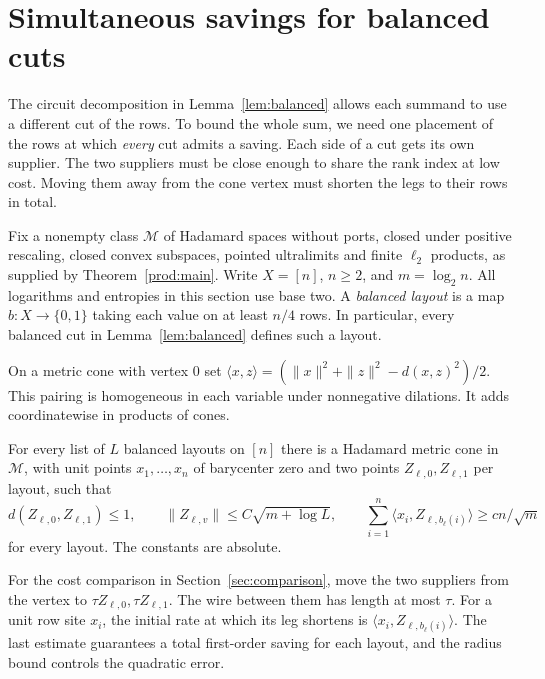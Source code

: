 \section{Simultaneous savings for balanced cuts}\label{sec:lamps}

The circuit decomposition in Lemma~\ref{lem:balanced} allows each summand
to use a different cut of the rows. To bound the whole sum, we need one
placement of the rows at which \emph{every} cut admits a saving. Each
side of a cut gets its own supplier. The two suppliers must be close
enough to share the rank index at low cost. Moving them away from the
cone vertex must shorten the legs to their rows in total.

Fix a nonempty class \(\mathcal M\) of Hadamard spaces without ports,
closed under positive rescaling, closed convex subspaces, pointed
ultralimits and finite \(\ell_2\) products, as supplied by
Theorem~\ref{prod:main}. Write \(X=[n]\), \(n\ge2\), and \(m=\log_2 n\).
All logarithms and entropies in this section use base two. A
\emph{balanced layout} is a map \(b:X\to\{0,1\}\) taking each value on
at least \(n/4\) rows. In particular, every balanced cut in
Lemma~\ref{lem:balanced} defines such a layout.

On a metric cone with vertex \(0\) set
\(
 \langle x,z\rangle=(\|x\|^2+\|z\|^2-d(x,z)^2)/2
\).
This pairing is homogeneous in each variable under nonnegative dilations.
It adds coordinatewise in products of cones.

\begin{theorem}\label{lamp:certificate}
For every list of \(L\) balanced layouts on \([n]\) there is a Hadamard
metric cone in \(\mathcal M\), with unit points \(x_1,\ldots,x_n\)
of barycenter zero and two points \(Z_{\ell,0},Z_{\ell,1}\) per layout,
such that
\[
 d(Z_{\ell,0},Z_{\ell,1})\le1,\qquad
 \|Z_{\ell,v}\|\le C\sqrt{m+\log L},\qquad
 \sum_{i=1}^n\langle x_i,Z_{\ell,b_\ell(i)}\rangle
     \ge c n/\sqrt m
\]
for every layout. The constants are absolute.
\end{theorem}

For the cost comparison in Section~\ref{sec:comparison}, move the two
suppliers from the vertex to
\(\tau Z_{\ell,0},\tau Z_{\ell,1}\). The wire between them has length
at most \(\tau\). For a unit row site \(x_i\), the initial rate at
which its leg shortens is \(\langle x_i,Z_{\ell,b_\ell(i)}\rangle\).
The last estimate guarantees a total first-order saving for each layout,
and the radius bound controls the quadratic error.

